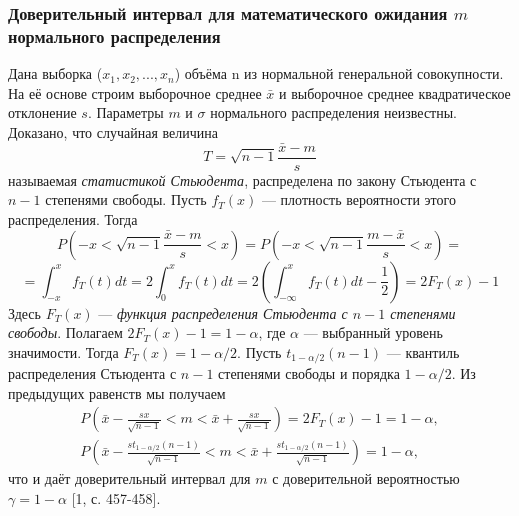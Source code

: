 \documentclass[a4paper]{article}
\begin{document}
	\subsubsection{Доверительный интервал для математического ожидания $m$ нормального распределения}
	Дана выборка ($x_{1},x_{2}, ... ,x_{n}$) объёма n из нормальной генеральной совокупности. На её основе строим выборочное среднее $\bar{x}$ и выборочное среднее квадратическое отклонение $s$. Параметры $m$ и $\sigma$ нормального распределения неизвестны.
	\newline
    Доказано, что случайная величина
    $$
        T = \sqrt{n - 1}\frac{\bar{x} - m}{s}
        \label{T}
    $$
    называемая \textit{статистикой Стьюдента}, распределена по закону Стьюдента с $n-1$ степенями свободы. Пусть $f_{T}(x)$ — плотность вероятности этого распределения. Тогда 
    $$
        P\left(-x < \sqrt{n - 1}\frac{\bar{x} - m}{s} < x \right) = 
        P\left(-x < \sqrt{n - 1}\frac{m - \bar{x}}{s} < x \right) = $$
        $$
        = \int_{-x}^{x}{f_{T}(t)d t} = 2 \int_{0}^{x}{f_{T}(t)d t} = 
        2\left(  \int_{-\infty}^{x}{f_{T}(t)d t} - \frac{1}{2} \right) = 2F_{T}(x) - 1
        $$
    Здесь $F_{T}(x)$ — \textit{функция распределения Стьюдента с $n-1$ степенями свободы}.
    \newline
    Полагаем $2F_{T}(x)-1 = 1-\alpha$, где $\alpha$ — выбранный уровень значимости. Тогда $F_{T}(x) = 1-\alpha/2$. Пусть $t_{1-\alpha/2}(n-1)$ — квантиль распределения Стьюдента с $n-1$ степенями свободы и порядка $1-\alpha/2$. Из предыдущих равенств мы получаем 
    \begin{equation}
        \begin{split}
             P\left(\bar{x} - \frac{sx}{\sqrt{n-1}} < m <  \bar{x} + \frac{sx}{\sqrt{n-1}}\right) = 2F_{T}(x) - 1 = 1 - \alpha,  \\
             P\left(\bar{x} - \frac{st_{1-\alpha/2}(n−1)}{\sqrt{n-1}} < m <  \bar{x} + \frac{st_{1-\alpha/2}(n−1)}{\sqrt{n-1}}\right)= 1 - \alpha, 
        \label{P_m}     
        \end{split}
    \end{equation}
    что и даёт доверительный интервал для $m$ с доверительной вероятностью $\gamma = 1-\alpha$ [1, с. 457-458].
    
\end{document}
